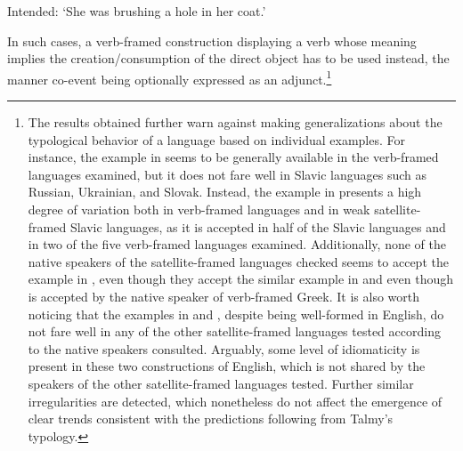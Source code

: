 \documentclass[output=paper,colorlinks,citecolor=brown]{langscibook}
\begin{document}
\ea \label{literalRubrushetc}  
\z 
\glt Intended: `She was brushing a hole in her coat.'
\z

\noindent In such cases, a verb-framed construction displaying a verb whose meaning implies the creation/consumption of the direct object has to be used instead, the manner co-event being optionally expressed as an adjunct.\footnote{The results obtained further warn against making generalizations about the typological behavior of a language based on individual examples. For instance, the example in  seems to be generally available in the verb-framed languages examined, but it does not fare well in Slavic languages such as Russian, Ukrainian, and Slovak. Instead, the example in  presents a high degree of variation both in verb-framed languages and in weak satellite-framed Slavic languages, as it is accepted in half of the Slavic languages and in two of the five verb-framed languages examined.  Additionally, none of the native speakers of the satellite-framed languages checked seems to accept the example in , even though they accept the similar example in  and even though  is accepted by the native speaker of verb-framed Greek. It is also worth noticing that the examples in  and , despite being well-formed in English, do not fare well in any of the other satellite-framed languages tested according to the native speakers consulted. Arguably, some level of idiomaticity is present in these two constructions of English, which is not shared by the speakers of the other satellite-framed languages tested. Further similar irregularities are detected, which nonetheless do not affect the emergence of clear trends consistent with the predictions following from Talmy's typology.}
\end{document}
